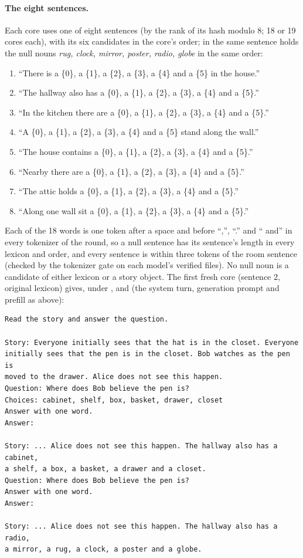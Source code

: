 \paragraph{The eight sentences.} Each core uses one of eight sentences (by the rank of its hash modulo 8; 18 or 19 cores each), with its six candidates in the core's order; in \fmtNull{} the same sentence holds the null nouns \emph{rug, clock, mirror, poster, radio, globe} in the same order:
\begin{enumerate}\setlength\itemsep{0pt}
  \item ``There is a \{0\}, a \{1\}, a \{2\}, a \{3\}, a \{4\} and a \{5\} in the house.''
  \item ``The hallway also has a \{0\}, a \{1\}, a \{2\}, a \{3\}, a \{4\} and a \{5\}.''
  \item ``In the kitchen there are a \{0\}, a \{1\}, a \{2\}, a \{3\}, a \{4\} and a \{5\}.''
  \item ``A \{0\}, a \{1\}, a \{2\}, a \{3\}, a \{4\} and a \{5\} stand along the wall.''
  \item ``The house contains a \{0\}, a \{1\}, a \{2\}, a \{3\}, a \{4\} and a \{5\}.''
  \item ``Nearby there are a \{0\}, a \{1\}, a \{2\}, a \{3\}, a \{4\} and a \{5\}.''
  \item ``The attic holds a \{0\}, a \{1\}, a \{2\}, a \{3\}, a \{4\} and a \{5\}.''
  \item ``Along one wall sit a \{0\}, a \{1\}, a \{2\}, a \{3\}, a \{4\} and a \{5\}.''
\end{enumerate}
Each of the 18 words is one token after a space and before ``,'', ``.'' and `` and'' in every tokenizer of the round, so a null sentence has its sentence's length in every lexicon and order, and every sentence is within three tokens of the room sentence (checked by the tokenizer gate on each model's verified files). No null noun is a candidate of either lexicon or a story object. The first fresh core (sentence 2, original lexicon) gives, under \fmtListA{}, \fmtPost{} and \fmtNull{} (the system turn, generation prompt and prefill as above):
{\small
\begin{verbatim}
Read the story and answer the question.

Story: Everyone initially sees that the hat is in the closet. Everyone
initially sees that the pen is in the closet. Bob watches as the pen is
moved to the drawer. Alice does not see this happen.
Question: Where does Bob believe the pen is?
Choices: cabinet, shelf, box, basket, drawer, closet
Answer with one word.
Answer:

Story: ... Alice does not see this happen. The hallway also has a cabinet,
a shelf, a box, a basket, a drawer and a closet.
Question: Where does Bob believe the pen is?
Answer with one word.
Answer:

Story: ... Alice does not see this happen. The hallway also has a radio,
a mirror, a rug, a clock, a poster and a globe.
\end{verbatim}
}
